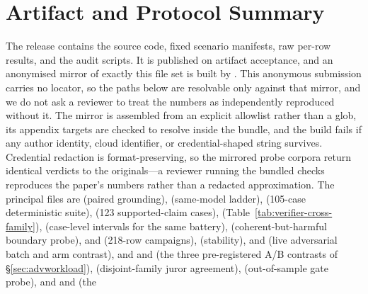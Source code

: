 \section{Artifact and Protocol Summary}
\label{app:artifacts}
The release contains the source code, fixed scenario manifests, raw per-row
results, and the audit scripts. It is published on artifact acceptance, and an
anonymised mirror of exactly this file set is built by
. This anonymous submission carries no
locator, so the paths below are resolvable only against that mirror, and we do
not ask a reviewer to treat the numbers as independently reproduced without it.
The mirror is assembled from an explicit allowlist rather than a glob, its
appendix targets are checked to resolve inside the bundle, and the build fails
if any author identity, cloud identifier, or credential-shaped string survives.
Credential redaction is format-preserving, so the mirrored probe corpora return
identical verdicts to the originals---a reviewer running the bundled checks
reproduces the paper's numbers rather than a redacted approximation. The
principal files are
 (paired grounding),
 (same-model ladder),
 (105-case deterministic suite),
 (123 supported-claim cases),
 (Table~\ref{tab:verifier-cross-family}),
 (case-level intervals for the same battery),
 (coherent-but-harmful boundary probe),
 and
 (218-row campaigns),
 (stability),
 and
 (live adversarial batch and
arm contrast),
 and
 and
 (the three pre-registered
A/B contrasts of \S\ref{sec:advworkload}),
 (disjoint-family
juror agreement), 
(out-of-sample gate probe), and
 and
 (the
